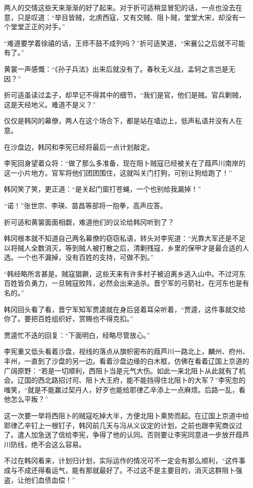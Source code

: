 两人的交情这些天来渐渐的好了起来。对于折可适稍显冒犯的话，一点也没去在意，只是叹道：“举目皆贼，北虏西寇，又有交贼、阻卜贼，堂堂大宋，却没有一个堂堂正正的对手。”

“难道要学着徐禧的话，王师不鼓不成列吗？”折可适笑道，“宋襄公之后就不可能有了。”

黄裳一声感慨：“《孙子兵法》出来后就没有了。春秋无义战，孟轲之言岂是无因？”

折可适虽读过孟子，却早记不得其中的细节，“我们是官，他们是贼。官兵剿贼，这是天经地义。难道不是义？”

仅仅是韩冈的幕僚，两人在这个场合下，都是站在墙边上，低声私语并没有人在意。

在沙盘边，韩冈和李宪已经将最后一点计划敲定。

李宪回身望着众将：“做了那么多准备，现在阻卜贼寇已经被关在了葭芦川南岸的这一小片地方。官军将他们团团围住，这就叫关门打狗，可别让狗给跑了！”

韩冈笑了笑，更正道：“是关起门窗打苍蝇，一个也别给我漏掉！”

“诺！”张世宗、李瑛、苗昌等部将一抱拳，高声应答。

折可适和黄裳面面相觑，难道他们的议论给韩冈听到了？

韩冈根本就不知道自己两名幕僚的窃窃私语，转头对李宪道：“光靠大军还是不足以将贼人全数消灭，等到贼人被打散之后，清剿残寇，乡里的保甲才是最合适的人选。一个也不漏掉，没有百姓的支持，可做不到。”

“韩经略所言甚是。贼寇猖獗，这些天来有许多村子被迫离乡逃入山中。不过河东百姓皆负勇力，一旦贼寇败阵，必然会出来追杀。晋宁军的弓箭社，在河东也是有名的。”

韩冈回头看了看，晋宁军知军贾逵就在身后竖着耳朵听着，“贾逵，这件事就交给你了。要把百姓组织好，赏赐也不得克扣。”

贾逵忙不迭的回复：“下面明白，经略尽管放心。”

李宪重又低头看着沙盘，视线的落点从旗帜密布的葭芦川一路北上，麟州、府州、丰州，一直到了沙盘的另一边。看着沙盘边缘的白木框，仿佛在看着辽国上京道的广阔原野：“若是一切顺利，西阻卜当是元气大伤。如此一来北阻卜从此就有了机会。辽国的西北路招讨司、阻卜大王府，能不能挡得住北阻卜的大军？”李宪忽的嗤笑，“就是不能赢过契丹人，好歹也能给耶律乙辛添上一点麻烦。后路一乱，看他怎么平叛？”

这一次要一举将西阻卜的贼寇吃掉大半，方便北阻卜乘势而起。在辽国上京道中给耶律乙辛钉上一根钉子，韩冈前几天与冯从义议定的计划，之前也跟李宪商议过了。遣人加急送了信给李宪，争得了他的认同。否则要让李宪同意进一步放开葭芦川防线，绝不会这么容易。

不过在韩冈看来，计划归计划，实际运作的情况可不一定会有那么顺利，“这件事成与不成还得看运气，能有那就最好了。不过这不是主要目的，消灭这群阻卜强盗，让他们血债血偿！”

